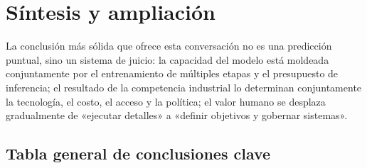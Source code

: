 \section{Síntesis y ampliación}

La conclusión más sólida que ofrece esta conversación no es una predicción puntual, sino un sistema de juicio: la capacidad del modelo está moldeada conjuntamente por el entrenamiento de múltiples etapas y el presupuesto de inferencia; el resultado de la competencia industrial lo determinan conjuntamente la tecnología, el costo, el acceso y la política; el valor humano se desplaza gradualmente de «ejecutar detalles» a «definir objetivos y gobernar sistemas».

\subsection{Tabla general de conclusiones clave}

